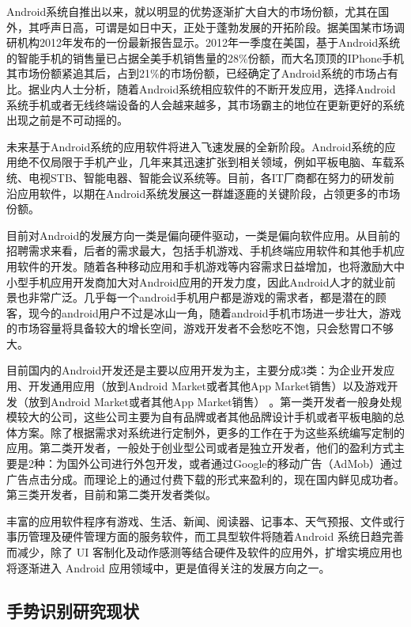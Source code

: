 \documentclass{XDBAthesis}
\begin{document}
Android系统自推出以来，就以明显的优势逐渐扩大自大的市场份额，尤其在国外，其呼声日高，可谓是如日中天，正处于蓬勃发展的开拓阶段\cite{张华2012android}。据美国某市场调研机构2012年发布的一份最新报告显示。2012年一季度在美国，基于Android系统的智能手机的销售量已占据全美手机销售量的28\%份额，而大名顶顶的IPhone手机其市场份额紧追其后，占到21\%的市场份额，已经确定了Android系统的市场占有比。据业内人士分析，随着Android系统相应软件的不断开发应用，选择Android系统手机或者无线终端设备的人会越来越多，其市场霸主的地位在更新更好的系统出现之前是不可动摇的。

  未来基于Android系统的应用软件将进入飞速发展的全新阶段。Android系统的应用绝不仅局限于手机产业，几年来其迅速扩张到相关领域，例如平板电脑、车载系统、电视STB、智能电器、智能会议系统等。目前，各IT厂商都在努力的研发前沿应用软件，以期在Android系统发展这一群雄逐鹿的关键阶段，占领更多的市场份额。

目前对Android的发展方向一类是偏向硬件驱动，一类是偏向软件应用\cite{张建平2013基于}。从目前的招聘需求来看，后者的需求最大，包括手机游戏、手机终端应用软件和其他手机应用软件的开发。随着各种移动应用和手机游戏等内容需求日益增加，也将激励大中小型手机应用开发商加大对Android应用的开发力度，因此Android人才的就业前景也非常广泛。几乎每一个android手机用户都是游戏的需求者，都是潜在的顾客，现今的android用户不过是冰山一角，随着android手机市场进一步壮大，游戏的市场容量将具备较大的增长空间，游戏开发者不会愁吃不饱，只会愁胃口不够大。

目前国内的Android开发还是主要以应用开发为主，主要分成3类：为企业开发应用、开发通用应用（放到Android Market或者其他App Market销售）以及游戏开发（放到Android Market或者其他App Market销售）\cite{许瑾2011基于} 。第一类开发者一般身处规模较大的公司，这些公司主要为自有品牌或者其他品牌设计手机或者平板电脑的总体方案。除了根据需求对系统进行定制外，更多的工作在于为这些系统编写定制的应用。第二类开发者，一般处于创业型公司或者是独立开发者，他们的盈利方式主要是2种：为国外公司进行外包开发，或者通过Google的移动广告（AdMob）通过广告点击分成。而理论上的通过付费下载的形式来盈利的，现在国内鲜见成功者。第三类开发者，目前和第二类开发者类似。

丰富的应用软件程序有游戏、生活、新闻、阅读器、记事本、天气预报、文件或行事历管理及硬件管理方面的服务软件，而工具型软件将随着Android 系统日趋完善而减少，除了 UI 客制化及动作感测等结合硬件及软件的应用外，扩增实境应用也将逐渐进入 Android 应用领域中，更是值得关注的发展方向之一。

\subsection{手势识别研究现状}
\end{document}
